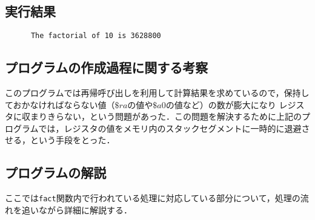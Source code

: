 \documentclass[a4j,11pt]{jarticle}
\begin{document}
\subsection{実行結果}

\begin{verbatim}
      The factorial of 10 is 3628800      
\end{verbatim}

\subsection{プログラムの作成過程に関する考察}

このプログラムでは再帰呼び出しを利用して計算結果を求めているので，保持しておかなければならない値（$\$ra$の値や$\$a0$の値など）の数が膨大になり
レジスタに収まりきらない，という問題があった．この問題を解決するために上記のプログラムでは，レジスタの値をメモリ内のスタックセグメントに一時的に退避させる，という手段をとった．

\subsection{プログラムの解説}
ここでは{\tt fact}関数内で行われている処理に対応している部分について，処理の流れを追いながら詳細に解説する．
\end{document}
